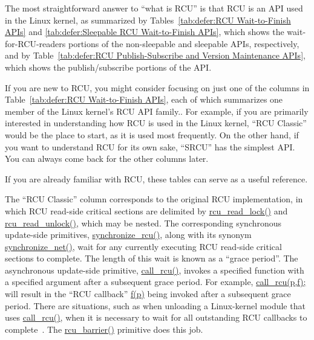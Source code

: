 The most straightforward answer to ``what is RCU'' is that RCU is
an API used in the Linux kernel, as summarized by
Tables~\ref{tab:defer:RCU Wait-to-Finish APIs} and
\ref{tab:defer:Sleepable RCU Wait-to-Finish APIs},
which shows the wait-for-RCU-readers portions of the non-sleepable and
sleepable APIs, respectively,
and by
Table~\ref{tab:defer:RCU Publish-Subscribe and Version Maintenance APIs},
which shows the publish/subscribe portions of the API.

If you are new to RCU, you might consider focusing on just one
of the columns in
Table~\ref{tab:defer:RCU Wait-to-Finish APIs},
each of which summarizes one member of the Linux kernel's RCU API family..
For example, if you are primarily interested in understanding how RCU
is used in the Linux kernel, ``RCU Classic'' would be the place to start,
as it is used most frequently.
On the other hand, if you want to understand RCU for its own sake,
``SRCU'' has the simplest API.
You can always come back for the other columns later.

If you are already familiar with RCU, these tables can
serve as a useful reference.

 \QuickQuizEnd

The ``RCU Classic'' column corresponds to the original RCU implementation,
in which RCU read-side critical sections are delimited by
\url{rcu_read_lock()} and \url{rcu_read_unlock()}, which
may be nested.
The corresponding synchronous update-side primitives,
\url{synchronize_rcu()}, along with its synonym
\url{synchronize_net()}, wait for any currently executing
RCU read-side critical sections to complete.
The length of this wait is known as a ``grace period''.
The asynchronous update-side primitive, \url{call_rcu()},
invokes a specified function with a specified argument after a
subsequent grace period.
For example, \url{call_rcu(p,f);} will result in
the ``RCU callback'' \url{f(p)}
being invoked after a subsequent grace period.
There are situations,
such as when unloading a Linux-kernel module that uses \url{call_rcu()},
when it is necessary to wait for all
outstanding RCU callbacks to complete~\cite{PaulEMcKenney2007rcubarrier}.
The \url{rcu_barrier()} primitive does this job.

